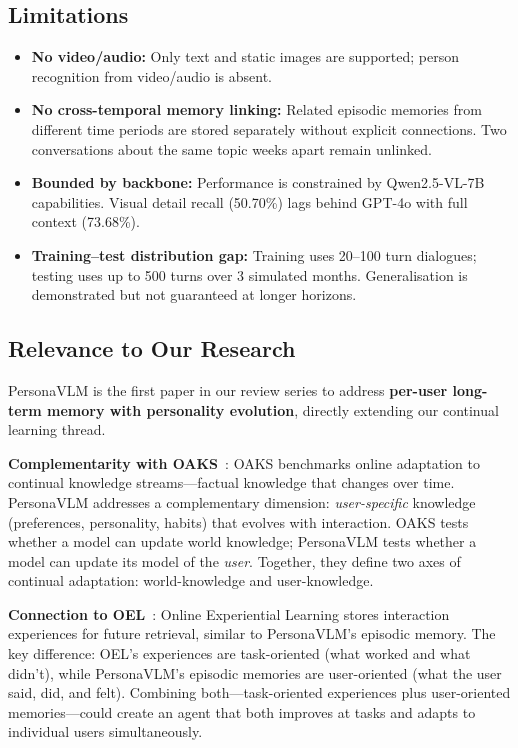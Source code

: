\documentclass[11pt]{article}
\begin{document}
\subsection{Limitations}

\begin{itemize}
    \item \textbf{No video/audio:} Only text and static images are supported; person recognition from video/audio is absent.

    \item \textbf{No cross-temporal memory linking:} Related episodic memories from different time periods are stored separately without explicit connections. Two conversations about the same topic weeks apart remain unlinked.

    \item \textbf{Bounded by backbone:} Performance is constrained by Qwen2.5-VL-7B capabilities. Visual detail recall (50.70\%) lags behind GPT-4o with full context (73.68\%).

    \item \textbf{Training--test distribution gap:} Training uses 20--100 turn dialogues; testing uses up to 500 turns over 3 simulated months. Generalisation is demonstrated but not guaranteed at longer horizons.
\end{itemize}

\subsection{Relevance to Our Research}

PersonaVLM is the first paper in our review series to address \textbf{per-user long-term memory with personality evolution}, directly extending our continual learning thread.

\textbf{Complementarity with OAKS}~\cite{oaks}: OAKS benchmarks online adaptation to continual knowledge streams---factual knowledge that changes over time. PersonaVLM addresses a complementary dimension: \textit{user-specific} knowledge (preferences, personality, habits) that evolves with interaction. OAKS tests whether a model can update world knowledge; PersonaVLM tests whether a model can update its model of the \textit{user}. Together, they define two axes of continual adaptation: world-knowledge and user-knowledge.

\textbf{Connection to OEL}~\cite{oel}: Online Experiential Learning stores interaction experiences for future retrieval, similar to PersonaVLM's episodic memory. The key difference: OEL's experiences are task-oriented (what worked and what didn't), while PersonaVLM's episodic memories are user-oriented (what the user said, did, and felt). Combining both---task-oriented experiences plus user-oriented memories---could create an agent that both improves at tasks and adapts to individual users simultaneously.
\end{document}
